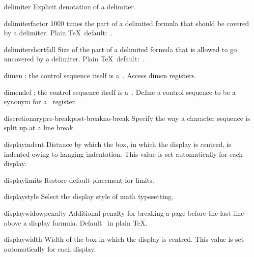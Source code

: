 \item delimiter
      Explicit denotation of a delimiter.

\item delimiterfactor
      1000 times the part of a delimited formula that should be
      covered by a delimiter.
      Plain \TeX\ default:~.

\item delimitershortfall
      Size of the part of a delimited formula that is allowed 
      to go uncovered by a delimiter.
      Plain \TeX\ default:~\n{5pt}.

\item dimen
      ; the control sequence itself
      is a~.
      Access dimen registers.

\item dimendef
      ; the control sequence
      itself is a~.
      Define a control sequence to be a synonym for
      a~ register.

\item discretionary\SerifFont\italic\lb pre-break\rb\lb post-break\rb\lb no-break\rb{}
      Specify the way a character sequence is split up at a line break.

\item displayindent
      Distance by which the box, in which the display 
      is centred, is indented owing to hanging indentation.
      This value is set automatically for each display.

\item displaylimits
      Restore default placement for limits.

\item displaystyle
      Select the display style of math typesetting.

\item displaywidowpenalty
      Additional penalty for breaking a page before the last line 
      above a display formula. 
      Default~ in plain \TeX.

\item displaywidth
      Width of the box in which the display is centred.
      This value is set automatically for each display.

